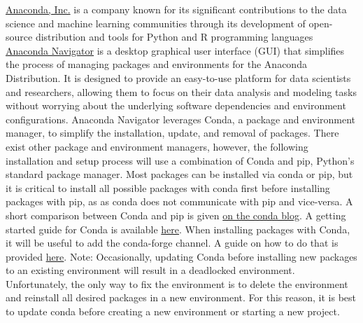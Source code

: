 \documentclass[12pt,oneside,letterpaper]{article}
\begin{document}
\href{https://www.anaconda.com/}{Anaconda, Inc.}  is a company known for its significant contributions to the data science and machine learning communities through its development of open-source distribution and tools for Python and R programming languages \href{https://www.anaconda.com/products/navigator}{Anaconda Navigator} is a desktop graphical user interface (GUI) that simplifies the process of managing packages and environments for the Anaconda Distribution. It is designed to provide an easy-to-use platform for data scientists and researchers, allowing them to focus on their data analysis and modeling tasks without worrying about the underlying software dependencies and environment configurations. Anaconda Navigator leverages Conda, a package and environment manager, to simplify the installation, update, and removal of packages. There exist other package and environment managers, however, the following installation and setup process will use a combination of Conda and pip, Python's standard package manager. Most packages can be installed via conda or pip, but it is critical to install all possible packages with conda first before installing packages with pip, as as conda does not communicate with pip and vice-versa. %
A short comparison between Conda and pip is given \href{https://www.anaconda.com/blog/understanding-conda-and-pip}{on the conda blog}. 
A getting started guide for Conda is available \href{https://docs.conda.io/projects/conda/en/latest/user-guide/getting-started.html}{here}.
When installing packages with Conda, it will be useful to add the conda-forge channel. A guide on how to do that is provided \href{https://docs.conda.io/projects/conda/en/latest/user-guide/concepts/channels.html}{here}.
Note: Occasionally, updating Conda before installing new packages to an existing environment will result in a deadlocked environment. Unfortunately, the only way to fix the environment is to delete the environment and reinstall all desired packages in a new environment. For this reason, it is best to update conda before creating a new environment or starting a new project.
\end{document}
